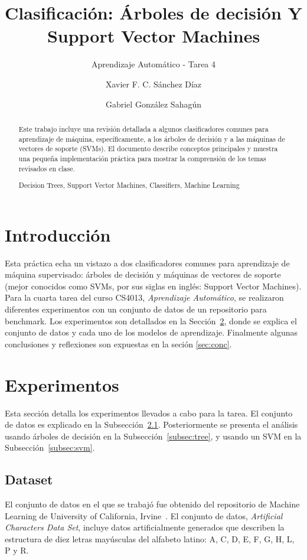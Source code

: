\documentclass{llncs}
\title{Clasificación: Árboles de decisión Y Support Vector Machines}
\subtitle{Aprendizaje Automático - Tarea 4}
\author{Xavier F. C. Sánchez Díaz
\and Gabriel González Sahagún}
\institute{Tecnológico de Monterrey \\
\mailsa}
\newcommand{\keywords}[1]{\par\addvspace\baselineskip
\noindent\keywordname\enspace\ignorespaces#1}
\begin{document}
\maketitle
\begin{abstract}
Este trabajo incluye una revisión detallada a algunos clasificadores comunes para aprendizaje de máquina,
específicamente, a los árboles de decisión y a las máquinas de vectores de soporte (SVMs).
El documento describe conceptos principales y muestra una pequeña implementación práctica para mostrar la comprensión de los temas revisados en clase.
\keywords{Decision Trees, Support Vector Machines, Classifiers, Machine Learning}
\end{abstract}

\section{Introducción}
\label{sec:intro}

Esta práctica echa un vistazo a dos clasificadores comunes para aprendizaje de máquina supervisado:
árboles de decisión y máquinas de vectores de soporte
(mejor conocidos como SVMs, por sus siglas en inglés: Support Vector Machines).
Para la cuarta tarea del curso CS4013, \textit{Aprendizaje Automático},
se realizaron diferentes experimentos con un conjunto de datos de un repositorio para benchmark.
Los experimentos son detallados en la Sección~\ref{sec:exp},
donde se explica el conjunto de datos y cada uno de los modelos de aprendizaje.
Finalmente algunas conclusiones y reflexiones son expuestas en la seción \ref{sec:conc}.

\section{Experimentos}
\label{sec:exp}

Esta sección detalla los experimentos llevados a cabo para la tarea.
El conjunto de datos es explicado en la Subsección~\ref{subsec:data}.
Posteriormente se presenta el análisis usando árboles de decisión en la Subsección~\ref{subsec:tree},
y usando un SVM en la Subsección~\ref{subsec:svm}.

\subsection{Dataset}
\label{subsec:data}

El conjunto de datos en el que se trabajó fue obtenido del repositorio de Machine Learning de University of California, Irvine~\cite{Lichman:2013}.
El conjunto de datos, \textit{Artificial Characters Data Set}, incluye datos artificialmente generados que describen la estructura de diez letras mayúsculas del alfabeto latino:
A, C, D, E, F, G, H, L, P y R.
\end{document}

